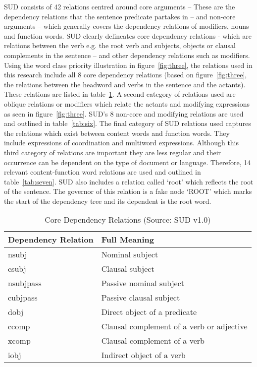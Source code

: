 SUD consists of 42 relations centred around core arguments -- These are the dependency relations that the sentence predicate partakes in -- and non-core arguments -- which generally covers the dependency relations of modifiers, nouns and function words. SUD clearly delineates core dependency relations - which are relations between the verb e.g. the root verb and subjects, objects or clausal complements in the sentence -- and other dependency relations such as modifiers. Using the word class priority illustration in figure~\ref{fig:three}, the relations used in this research include all 8 core dependency relations (based on figure~\ref{fig:three}, the relations between the headword and verbs in the sentence and the actants). These relations are listed in table~\ref{tab:five}.  A second category of relations used are oblique relations or modifiers which relate the actants and modifying expressions as seen in figure~\ref{fig:three}. SUD's 8 non-core and modifying relations are used and outlined in table~\ref{tab:six}. The final category of SUD relations used captures the relations which exist between content words and function words. They include expressions of coordination and multiword expressions. Although this third category of relations are important they are less regular and their occurrence can be dependent on the type of document or language. Therefore, 14 relevant content-function word relations are used and outlined in table~\ref{tab:seven}. SUD also includes a relation called `root' which reflects the root of the sentence. The governor of this relation is a fake node `ROOT' which marks the start of the dependency tree and its dependent is the root word.


\begin{table}%
\caption{Core Dependency Relations (Source: SUD v1.0)}
\label{tab:five}
\begin{minipage}{\columnwidth}
\begin{center}
\begin{tabular}{ll}
  \toprule
Dependency Relation &	Full Meaning \\
  \toprule
nsubj	& Nominal subject \\
csubj	& Clausal subject \\
nsubjpass	& Passive nominal subject \\
cubjpass	& Passive clausal subject \\
dobj	& Direct object of a predicate \\
ccomp	& Clausal complement of a verb or adjective \\
xcomp	& Clausal complement of a verb \\
iobj	& Indirect object of a verb \\
  \bottomrule
\end{tabular}
\end{center}
\bigskip\centering

\end{minipage}
\end{table}%

